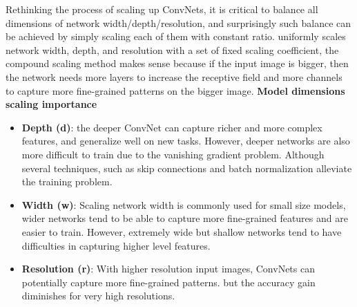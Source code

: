 \documentclass[10pt,twocolumn,letterpaper]{article}
\begin{document}
Rethinking the process of scaling up ConvNets, it is critical to balance all dimensions of network width/depth/resolution, and surprisingly such balance can be achieved by simply scaling each of them with constant ratio. uniformly scales network width, depth, and resolution with a set of fixed scaling coefficient, the compound scaling method makes sense because if the input image is bigger, then the network needs more layers to increase the receptive field and more channels to capture more fine-grained patterns on the bigger image.
\newline
\newline
\textbf{Model dimensions scaling importance }
\begin{itemize}
    \item \textbf{Depth (d)}: the  deeper ConvNet can capture richer and more complex features, and generalize well on new tasks. However, deeper networks are also more difficult to train due to the vanishing gradient problem. Although several techniques, such as skip connections and batch normalization alleviate the training problem.
    \item \textbf{Width (w)}: Scaling network width is commonly used for small size models, wider networks tend to be able to capture more fine-grained features and are easier to train. However, extremely wide but shallow networks tend to have difficulties in capturing higher level features.
    \item \textbf{Resolution (r)}: With higher resolution input images, ConvNets can potentially capture more fine-grained patterns. but the accuracy gain diminishes for very high resolutions. 
\end{itemize}
\end{document}

